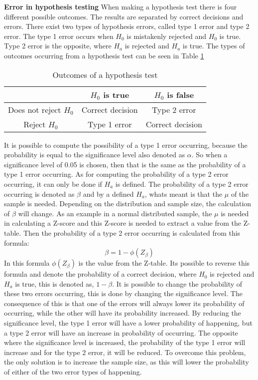 \newline
\noindent \textbf{Error in hypothesis testing}
\newline
When making a hypothesis test there is four different possible outcomes. The results are separated by correct decisions and errors. There exist two types of hypothesis errors, called type 1 error and type 2 error. The type 1 error occurs when $H_0$ is mistakenly rejected and $H_0$ is true. Type 2 error is the opposite, where $H_a$ is rejected and $H_a$ is true. The types of outcomes occurring from a hypothesis test can be seen in Table \ref{tab:example2x3}
\begin{table}[h!]
	\centering
	\begin{tabular}{|c|c|c|}
		\hline
		 & $H_0$ is true & $H_0$ is false \\
		\hline
		Does not reject $H_0$ & Correct decision & Type 2 error \\ \hline
		Reject $H_0$ & Type 1 error & Correct decision \\
		\hline
	\end{tabular}
	\caption{Outcomes of a hypothesis test}
	\label{tab:example2x3}
\end{table}

It is possible to compute the possibility of a type 1 error occurring, because the probability is equal to the significance level also denoted as $\alpha$. So when a significance level of 0.05 is chosen, then that is the same as the probability of a type 1 error occurring. As for computing the probability of a type 2 error occurring, it can only be done if $H_a$ is defined. The probability of a type 2 error occurring is denoted as $\beta$ and by a defined $H_a$, whats meant is that the $\mu$ of the sample is needed. Depending on the distribution and sample size, the calculation of $\beta$ will change.
As an example in a normal distributed sample, the $\mu$ is needed in calculating a Z-score and this Z-score is needed to extract a value from the Z-table. Then the probability of a type 2 error occurring is calculated from this formula:
$$
\beta = 1-\phi(Z_\beta)
$$
In this formula $\phi(Z_\beta)$ is the value from the Z-table. Its possible to reverse this formula and denote the probability of a correct decision, where $H_0$ is rejected and $H_a$ is true, this is denoted as, $1-\beta$.
It is possible to change the probability of these two errors occurring, this is done by changing the significance level. The consequence of this is that one of the errors will always lower its probability of occurring, while the other will have its probability increased. By reducing the significance level, the type 1 error will have a lower probability of happening, but a type 2 error will have an increase in probability of occurring. The opposite where the significance level is increased, the probability of the type 1 error will increase and for the type 2 error, it will be reduced. To overcome this problem, the only solution is to increase the sample size, as this will lower the probability of either of the two error types of happening.



